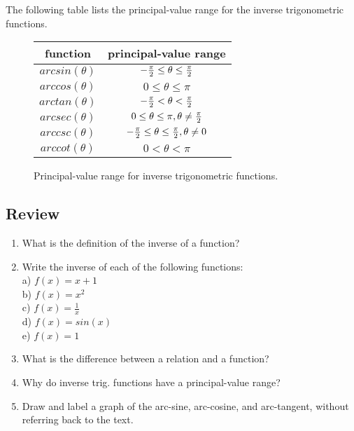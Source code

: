 The following table lists the principal-value range for the inverse trigonometric functions.\\

\begin{figure}[htb!]
\caption{Principal-value range for inverse trigonometric functions.}
\label{fig:principal_value_range}
\begin{center}
\begin{tabular}{ | c | c | }
\hline 
function & principal-value range\\
\hline 
$arcsin(\theta)$ & $-\frac{\pi}{2} \leq \theta \leq \frac{\pi}{2}$ \\
\hline 
$arccos(\theta)$ & $0 \leq \theta \leq \pi$ \\
\hline 
$arctan(\theta)$ & $-\frac{\pi}{2} < \theta < \frac{\pi}{2}$ \\
\hline 
$arcsec(\theta)$ & $0 \leq \theta \leq \pi, \theta \neq \frac{\pi}{2}$ \\
\hline 
$arccsc(\theta)$ & $-\frac{\pi}{2} \leq \theta \leq \frac{\pi}{2}, \theta \neq 0$ \\
\hline 
$arccot(\theta)$ & $0 < \theta < \pi$ \\
\hline
\end{tabular}
\end{center}
\end{figure}

\clearpage
\subsection{Review}

\begin{enumerate}

\item{What is the definition of the inverse of a function?}\\

\item{Write the inverse of each of the following functions:}\\

\tab a) $f(x) = x + 1$\\

\tab b) $f(x) = x^2$\\

\tab c) $f(x) = \frac{1}{x}$\\

\tab d) $f(x) = sin(x)$\\

\tab e) $f(x) = 1$\\

\item{What is the difference between a relation and a function?}\\

\item{Why do inverse trig. functions have a principal-value range?}\\

\item{Draw and label a graph of the arc-sine, arc-cosine, and arc-tangent, without referring back to the text.}\\

\end{enumerate}
